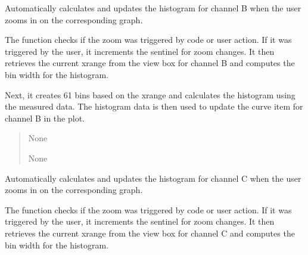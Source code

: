 \documentclass[letterpaper,10pt,english]{sphinxmanual}
\begin{document}
\begin{fulllineitems}
\begin{fulllineitems}
\end{fulllineitems}


\begin{fulllineitems}
\label{\detokenize{StartStopHist:StartStopHist.StartStopLogic.zoom_changedB}}
\pysigstartsignatures
{}
\pysigstopsignatures
\sphinxAtStartPar
Automatically calculates and updates the histogram for channel B when the user 
zooms in on the corresponding graph.

\sphinxAtStartPar
The function checks if the zoom was triggered by code or user action. If it was 
triggered by the user, it increments the sentinel for zoom changes. It then 
retrieves the current x\sphinxhyphen{}range from the view box for channel B and computes the 
bin width for the histogram.

\sphinxAtStartPar
Next, it creates 61 bins based on the x\sphinxhyphen{}range and calculates the histogram 
using the measured data. The histogram data is then used to update the curve 
item for channel B in the plot.
\begin{quote}\begin{description}
\sphinxAtStartPar
None

\sphinxAtStartPar
None

\end{description}\end{quote}

\end{fulllineitems}


\begin{fulllineitems}
\label{\detokenize{StartStopHist:StartStopHist.StartStopLogic.zoom_changedC}}
\pysigstartsignatures
{}
\pysigstopsignatures
\sphinxAtStartPar
Automatically calculates and updates the histogram for channel C when the user 
zooms in on the corresponding graph.

\sphinxAtStartPar
The function checks if the zoom was triggered by code or user action. If it was 
triggered by the user, it increments the sentinel for zoom changes. It then 
retrieves the current x\sphinxhyphen{}range from the view box for channel C and computes the 
bin width for the histogram.


\end{fulllineitems}
\end{fulllineitems}
\end{document}
